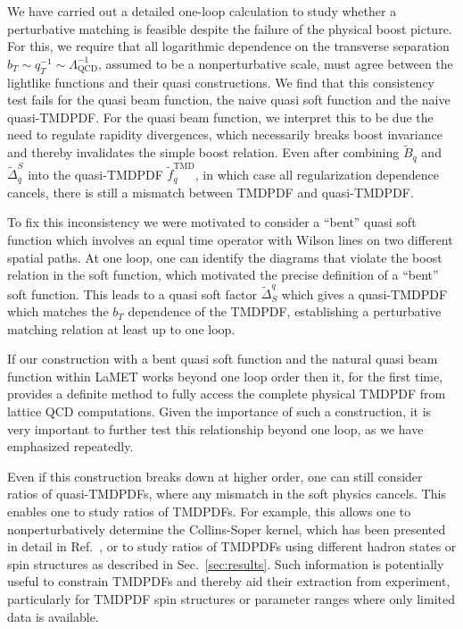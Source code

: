 \documentclass[11pt,a4paper]{article}
\DeclareRobustCommand{\sec}[1]{Sec.~\ref{sec:#1}}
\DeclareRobustCommand{\mycite}[1]{Ref.~\cite{#1}}
\newcommand{\LQCD}{\Lambda_\mathrm{QCD}}
\newcommand\TMD{\mathrm{TMD}}
\begin{document}
We have carried out a detailed one-loop calculation to study whether a perturbative matching is feasible despite the failure of the physical boost picture. For this, we require that all logarithmic dependence on the transverse separation $b_T \sim q_T^{-1} \sim \LQCD^{-1}$, assumed to be a nonperturbative scale, must agree between the lightlike functions and their quasi constructions.
We find that this consistency test fails for the quasi beam function, the naive quasi soft function and the naive quasi-TMDPDF.
For the quasi beam function, we interpret this to be due the need to regulate rapidity divergences, which necessarily breaks boost invariance and thereby invalidates the simple boost relation.
Even after combining $\tilde B_q$ and $\tilde\Delta_q^S$ into the quasi-TMDPDF $\tilde f_q^\TMD$, in which case all regularization dependence cancels, there is still a mismatch between TMDPDF and quasi-TMDPDF. 

To fix this inconsistency we were motivated to consider a ``bent'' quasi soft function which involves an equal time operator with Wilson lines on two different spatial paths. 
At one loop, one can identify the diagrams that violate the boost relation in the soft function, which motivated the precise definition of a ``bent'' soft function. This leads to a quasi soft factor $\tilde \Delta_S^q$ which gives a quasi-TMDPDF which matches the $b_T$ dependence of the TMDPDF, establishing a perturbative matching relation at least up to one loop. 

If our construction with a bent quasi soft function and the natural quasi beam function within LaMET works beyond one loop order then it, for the first time, provides a definite method to fully access the complete physical TMDPDF from lattice QCD computations. Given the importance of such a construction, it is very important to further test this relationship beyond one loop, as we have emphasized repeatedly.  

Even if this construction breaks down at higher order, one can still consider ratios of quasi-TMDPDFs, where any mismatch in the soft physics cancels. This enables one to study ratios of TMDPDFs.
For example, this allows one to nonperturbatively determine the Collins-Soper kernel, which has been presented in detail in \mycite{Ebert:2018gzl}, or to study ratios of TMDPDFs using different hadron states or spin structures as described in \sec{results}.
Such information is potentially useful to constrain TMDPDFs and thereby aid their extraction from experiment,
particularly for TMDPDF spin structures or parameter ranges where only limited data is available.
\end{document}
